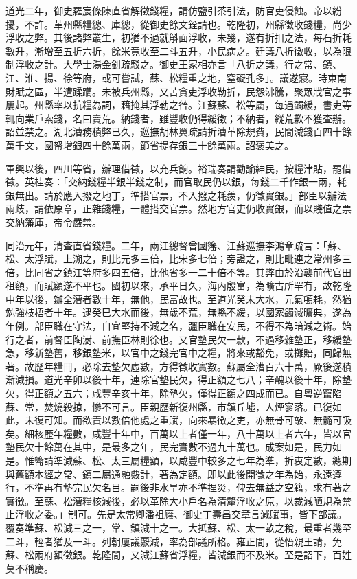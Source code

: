 \begin{pinyinscope}
道光二年，御史羅宸條陳直省解徵錢糧，請仿鹽引茶引法，防官吏侵蝕。帝以紛擾，不許。革州縣糧總、庫總，從御史餘文銓請也。乾隆初，州縣徵收錢糧，尚少浮收之弊。其後諸弊叢生，初猶不過就斛面浮收，未幾，遂有折扣之法，每石折耗數升，漸增至五折六折，餘米竟收至二斗五升，小民病之。廷議八折徵收，以為限制浮收之計。大學士湯金釗疏駁之。御史王家相亦言「八折之議，行之常、鎮、江、淮、揚、徐等府，或可嘗試，蘇、松糧重之地，窒礙孔多」。議遂寢。時東南財賦之區，半遭蹂躪。未被兵州縣，又苦貪吏浮收勒折，民怨沸騰，聚眾戕官之事屢起。州縣率以抗糧為詞，藉掩其浮勒之咎。江蘇蘇、松等屬，每遇蠲緩，書吏等輒向業戶索錢，名曰賣荒。納錢者，雖豐收仍得緩徵；不納者，縱荒歉不獲查辦。詔並禁之。湖北漕務積弊已久，巡撫胡林翼疏請折漕革除規費，民間減錢百四十餘萬千文，國帑增銀四十餘萬兩，節省提存銀三十餘萬兩。詔褒美之。

軍興以後，四川等省，辦理借徵，以充兵餉。裕瑞奏請勸諭紳民，按糧津貼，罷借徵。英桂奏：「交納錢糧半銀半錢之制，而官取民仍以銀，每錢二千作銀一兩，耗銀無出。請於應入撥之地丁，準搭官票，不入撥之耗羨，仍徵實銀。」部臣以辦法兩歧，請依原章，正雜錢糧，一體搭交官票。然地方官吏仍收實銀，而以賤值之票交納籓庫，帝令嚴禁。

同治元年，清查直省錢糧。二年，兩江總督曾國籓、江蘇巡撫李鴻章疏言：「蘇、松、太浮賦，上溯之，則比元多三倍，比宋多七倍；旁證之，則比毗連之常州多三倍，比同省之鎮江等府多四五倍，比他省多一二十倍不等。其弊由於沿襲前代官田租額，而賦額遂不平也。國初以來，承平日久，海內殷富，為曠古所罕有，故乾隆中年以後，辦全漕者數十年，無他，民富故也。至道光癸未大水，元氣頓耗，然猶勉強枝梧者十年。逮癸巳大水而後，無歲不荒，無縣不緩，以國家蠲減曠典，遂為年例。部臣職在守法，自宜堅持不減之名，疆臣職在安民，不得不為暗減之術。始行之者，前督臣陶澍、前撫臣林則徐也。又官墊民欠一款，不過移雜墊正，移緩墊急，移新墊舊，移銀墊米，以官中之錢完官中之糧，將來或豁免，或攤賠，同歸無著。故歷年糧冊，必除去墊欠虛數，方得徵收實數。蘇屬全漕百六十萬，厥後遂積漸減損。道光辛卯以後十年，連除官墊民欠，得正額之七八；辛醜以後十年，除墊欠，得正額之五六；咸豐辛亥十年，除墊欠，僅得正額之四成而已。自粵逆竄陷蘇、常，焚燒殺掠，慘不可言。臣親歷新復州縣，市鎮丘墟，人煙寥落。已復如此，未復可知。而欲責以數倍他處之重賦，向來暴徵之吏，亦無骨可敲、無髓可吸矣。細核歷年糧數，咸豐十年中，百萬以上者僅一年，八十萬以上者六年，皆以官墊民欠十餘萬在其中，是最多之年，民完實數不過九十萬也。成案如是，民力如是。惟籥請準減蘇、松、太三屬糧額，以咸豐中較多之七年為準，折衷定數，總期與舊額本經之常、鎮二屬通融覈計，著為定額。即以此後開徵之年為始，永遠遵行，不準再有墊完民欠名目。嗣後非水旱亦不準捏災，俾去無益之空籍，求有著之實徵。至蘇、松漕糧核減後，必以革除大小戶名為清釐浮收之原，以裁減陋規為禁止浮收之委。」制可。先是太常卿潘祖廕、御史丁壽昌交章言減賦事，皆下部議。覆奏準蘇、松減三之一，常、鎮減十之一。大抵蘇、松、太一畝之稅，最重者幾至二斗，輕者猶及一斗。列朝屢議覈減，率為部議所格。雍正間，從怡親王請，免蘇、松兩府額徵銀。乾隆間，又減江蘇省浮糧，皆減銀而不及米。至是詔下，百姓莫不稱慶。


\end{pinyinscope}
